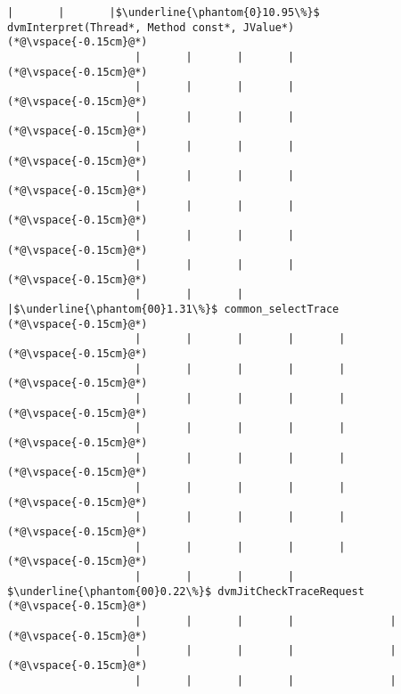 \begin{lstlisting}[caption=Staattinen metodi C$\to$Java , label=profile:C2JBenchmark00001, numberbychapter=true, frame=lines, float, floatplacement=t]
                    |       |       |$\underline{\phantom{0}10.95\%}$ dvmInterpret(Thread*, Method const*, JValue*)
(*@\vspace{-0.15cm}@*)
                    |       |       |       |
(*@\vspace{-0.15cm}@*)
                    |       |       |       |
(*@\vspace{-0.15cm}@*)
                    |       |       |       |
(*@\vspace{-0.15cm}@*)
                    |       |       |       |
(*@\vspace{-0.15cm}@*)
                    |       |       |       |
(*@\vspace{-0.15cm}@*)
                    |       |       |       |
(*@\vspace{-0.15cm}@*)
                    |       |       |       |
(*@\vspace{-0.15cm}@*)
                    |       |       |       |
(*@\vspace{-0.15cm}@*)
                    |       |       |       |$\underline{\phantom{00}1.31\%}$ common_selectTrace
(*@\vspace{-0.15cm}@*)
                    |       |       |       |       |
(*@\vspace{-0.15cm}@*)
                    |       |       |       |       |
(*@\vspace{-0.15cm}@*)
                    |       |       |       |       |
(*@\vspace{-0.15cm}@*)
                    |       |       |       |       |
(*@\vspace{-0.15cm}@*)
                    |       |       |       |       |
(*@\vspace{-0.15cm}@*)
                    |       |       |       |       |
(*@\vspace{-0.15cm}@*)
                    |       |       |       |       |
(*@\vspace{-0.15cm}@*)
                    |       |       |       |       |
(*@\vspace{-0.15cm}@*)
                    |       |       |       |        $\underline{\phantom{00}0.22\%}$ dvmJitCheckTraceRequest
(*@\vspace{-0.15cm}@*)
                    |       |       |       |               |
(*@\vspace{-0.15cm}@*)
                    |       |       |       |               |
(*@\vspace{-0.15cm}@*)
                    |       |       |       |               |

\end{lstlisting}
